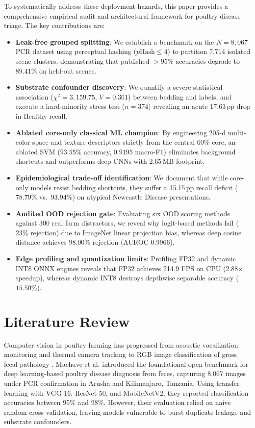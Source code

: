 \documentclass[conference]{IEEEtran}
\begin{document}
To systematically address these deployment hazards, this paper provides a comprehensive empirical audit and architectural framework for poultry disease triage. The key contributions are:
\begin{itemize}\setlength{\itemsep}{0.5pt}\setlength{\parskip}{0pt}\setlength{\parsep}{0pt}
    \item \textbf{Leak-free grouped splitting}: We establish a benchmark on the $N=8{,}067$ PCR dataset \cite{machuve2022poultry} using perceptual hashing ($p\text{Hash} \le 4$) to partition 7,714 isolated scene clusters, demonstrating that published $>95\%$ accuracies degrade to $89.41\%$ on held-out scenes.
    \item \textbf{Substrate confounder discovery}: We quantify a severe statistical association ($\chi^2 = 3{,}159.75$, $V = 0.361$) between bedding and labels, and execute a hard-minority stress test ($n=374$) revealing an acute 17.63\,pp drop in Healthy recall.
    \item \textbf{Ablated core-only classical ML champion}: By engineering 205-d multi-color-space and texture descriptors strictly from the central 60\% core, an ablated SVM ($93.55\%$ accuracy, $0.9195$ macro-F1) eliminates background shortcuts and outperforms deep CNNs with 2.65\,MB footprint.
    \item \textbf{Epidemiological trade-off identification}: We document that while core-only models resist bedding shortcuts, they suffer a 15.15\,pp recall deficit ($78.79\%$ vs.\ $93.94\%$) on atypical Newcastle Disease presentations.
    \item \textbf{Audited OOD rejection gate}: Evaluating six OOD scoring methods against 300 real farm distractors, we reveal why logit-based methods fail ($23\%$ rejection) due to ImageNet linear projection bias, whereas deep cosine distance achieves $98.00\%$ rejection (AUROC 0.9966).
    \item \textbf{Edge profiling and quantization limits}: Profiling FP32 and dynamic INT8 ONNX engines reveals that FP32 achieves 214.9 FPS on CPU (2.88$\times$ speedup), whereas dynamic INT8 destroys depthwise separable accuracy ($15.50\%$).
\end{itemize}

\section{Literature Review}
Computer vision in poultry farming has progressed from acoustic vocalization monitoring \cite{zhuang2018automated} and thermal camera tracking to RGB image classification of gross fecal pathology \cite{machuve2022poultry, owomugisha2021machine}. Machuve et al. \cite{machuve2022poultry} introduced the foundational open benchmark for deep learning-based poultry disease diagnosis from feces, capturing 8,067 images under PCR confirmation in Arusha and Kilimanjaro, Tanzania. Using transfer learning with VGG-16, ResNet-50, and MobileNetV2, they reported classification accuracies between 95\% and 98\%. However, their evaluation relied on naive random cross-validation, leaving models vulnerable to burst duplicate leakage and substrate confounders.
\end{document}
